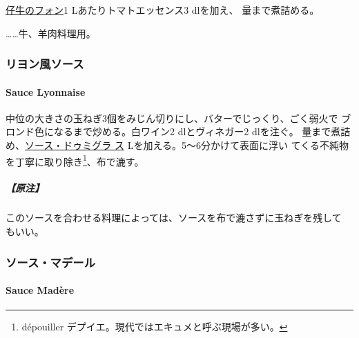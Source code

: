\begin{recette}

\protect\hyperlink{fonds-de-veau-brun}{仔牛のフォン}1
Lあたりトマトエッセンス3 dlを加え、 \quatrecinquiemes{}量まで煮詰める。

\ldots{}\ldots{}牛、羊肉料理用。

\maeaki

\hypertarget{ux30eaux30e8ux30f3ux98a8ux30bdux30fcux30b9}{%
\subsubsection{リヨン風ソース}\label{ux30eaux30e8ux30f3ux98a8ux30bdux30fcux30b9}}

\hypertarget{sauce-lyonnaise}{%
\paragraph{Sauce Lyonnaise}\label{sauce-lyonnaise}}

   

中位の大きさの玉ねぎ3個をみじん切りにし、バターでじっくり、ごく弱火で
ブロンド色になるまで炒める。白ワイン2 dlとヴィネガー2 dlを注ぐ。
\untiers{}量まで煮詰め、\protect\hyperlink{sauce-demi-glace}{ソース・ドゥミグラ
ス}\troisquarts{} Lを加える。5〜6分かけて表面に浮い
てくる不純物を丁寧に取り除き\footnote{dépouiller
  デプイエ。現代ではエキュメと呼ぶ現場が多い。}、布で漉す。

\hypertarget{ux539fux6ce8-5}{%
\subparagraph{【原注】}\label{ux539fux6ce8-5}}

このソースを合わせる料理によっては、ソースを布で漉さずに玉ねぎを残して
もいい。

\maeaki

\hypertarget{ux30bdux30fcux30b9ux30deux30c7ux30fcux30eb}{%
\subsubsection{ソース・マデール}\label{ux30bdux30fcux30b9ux30deux30c7ux30fcux30eb}}

\hypertarget{sauce-madere}{%
\paragraph{Sauce Madère}\label{sauce-madere}}


\end{recette}
